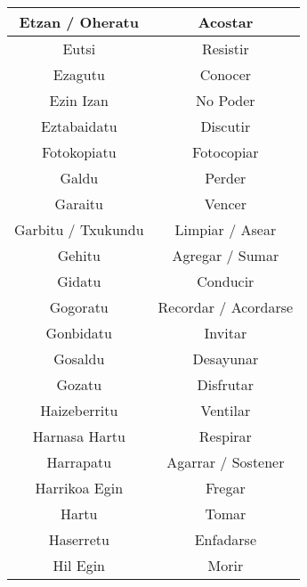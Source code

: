 \documentclass[11pt, a4paper]{article}
\begin{document}
\begin{longtable}{cc}
    \hline
    Etzan / Oheratu               & Acostar                        \\
    \hline
    Eutsi                         & Resistir                       \\
    \hline
    Ezagutu                       & Conocer                        \\
    \hline
    Ezin Izan                     & No Poder                       \\
    \hline
    Eztabaidatu                   & Discutir                       \\
    \hline
    Fotokopiatu                   & Fotocopiar                     \\
    \hline
    Galdu                         & Perder                         \\
    \hline
    Garaitu                       & Vencer                         \\
    \hline
    Garbitu / Txukundu            & Limpiar / Asear                \\
    \hline
    Gehitu                        & Agregar / Sumar                \\
    \hline
    Gidatu                        & Conducir                       \\
    \hline
    Gogoratu                      & Recordar / Acordarse           \\
    \hline
    Gonbidatu                     & Invitar                        \\
    \hline
    Gosaldu                       & Desayunar                      \\
    \hline
    Gozatu                        & Disfrutar                      \\
    \hline
    Haizeberritu                  & Ventilar                       \\
    \hline
    Harnasa Hartu                 & Respirar                       \\
    \hline
    Harrapatu                     & Agarrar / Sostener             \\
    \hline
    Harrikoa Egin                 & Fregar                         \\
    \hline
    Hartu                         & Tomar                          \\
    \hline
    Haserretu                     & Enfadarse                      \\
    \hline
    Hil Egin                      & Morir                          \\

\end{longtable}
\end{document}
